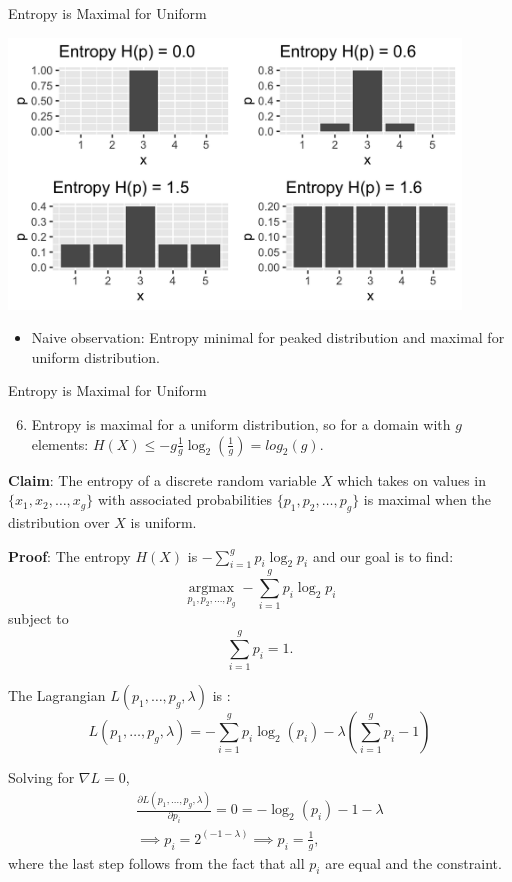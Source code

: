 \documentclass[11pt,compress,t,notes=noshow, xcolor=table]{beamer}
\begin{document}
\begin{vbframe}{Entropy is Maximal for Uniform}

\begin{center}
\includegraphics[width = 0.9\textwidth]{figure/max_entropy.png}
\end{center}

\begin{itemize}
   \item Naive observation: Entropy minimal for peaked distribution and maximal for uniform distribution.
\end{itemize}

\end{vbframe}

\begin{vbframe}{Entropy is Maximal for Uniform}
\begin{enumerate}
\setcounter{enumi}{5}
\item Entropy is maximal for a uniform distribution, so for a domain with $g$ elements:  
      $H(X) \leq -g\frac{1}{g} \log_2(\frac{1}{g}) = log_2(g)$.
\end{enumerate}
\vspace{0.2cm}
\textbf{Claim}: The entropy of a discrete random variable $X$ which takes on values in $\{x_1,x_2, \ldots, x_g\}$ with associated probabilities $\{p_1,p_2, \ldots, p_g\}$ is maximal when the distribution over $X$ is uniform.

\lz
\textbf{Proof}: The entropy $H(X)$ is $- \sum_{i=1}^g p_i \log_2 p_i$ and our goal is to find:
  $$\underset{p_{1}, p_{2}, \ldots, p_{g}}{\operatorname{argmax}}-\sum_{i=1}^{g} p_{i} \log _{2} p_{i}$$
  subject to
  $$\sum_{i=1}^g p_i = 1.$$
  
  \framebreak
  The Lagrangian $L(p_1, \ldots, p_g, \lambda)$ is :
  $$L(p_1, \ldots, p_g, \lambda) = - \sum_{i=1}^g p_i \log_2(p_i) - \lambda \left( \sum_{i=1}^g p_i - 1 \right)$$
  
  Solving for $\nabla L = 0$,
  \begin{gather*}
    \frac{\partial L(p_1, \ldots, p_g, \lambda)}{\partial p_i} = 0 = - \log_2(p_i) - 1 - \lambda \\
    \implies p_i = 2^{(-1 - \lambda)} \implies p_i = \frac{1}{g},
  \end{gather*}
  where the last step follows from the fact that all $p_i$ are equal and the constraint.

\end{vbframe}
\end{document}
